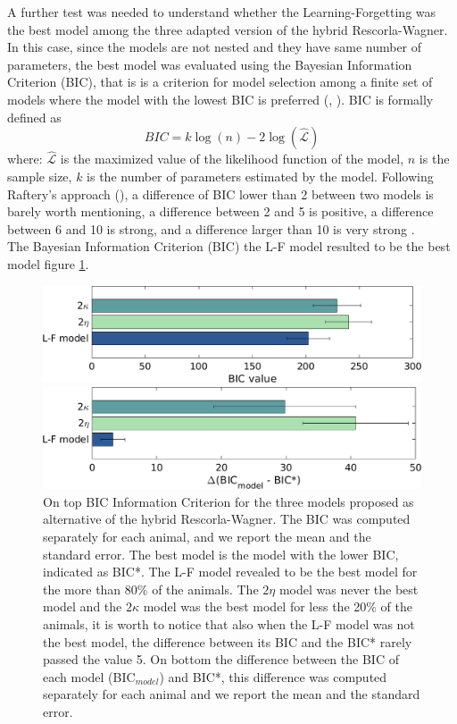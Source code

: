 A further test was needed to understand whether the Learning-Forgetting was the best model among the three adapted version of the hybrid Rescorla-Wagner. In this case, since the models are not nested and they have same number of parameters, the best model was evaluated using the Bayesian Information Criterion (BIC), that is is a criterion for model selection among a finite set of models where the model with the lowest BIC is preferred (\cite{Schwarz}, \cite{NeathCavanaugh}). BIC is formally defined as 
\begin{equation*}
    BIC=k\log(n)-2\log(\hat{\mathcal{L}})
\end{equation*}
where:
${\hat{\mathcal{L}}}$ is the maximized value of the likelihood function of the model, $n$ is the sample size, $k$ is the number of parameters estimated by the model.
Following Raftery’s approach (\cite{Raftery}), a difference of BIC lower than 2 between two models is barely worth mentioning, a difference between 2 and 5 is positive, a difference between 6 and 10 is strong, and a difference larger than 10 is very strong .\\
The Bayesian Information Criterion (BIC) the L-F model resulted to be the best model figure \ref{fig:BIC}.\\
\begin{figure}
    \centering
    \includegraphics[scale=0.5]{figures/BIC_Value.png}
    
    \vspace{1cm}
    
    \includegraphics[scale=0.5]{figures/DeltaBIC.png}
    \caption{On top BIC Information Criterion for the three models proposed as alternative of the hybrid Rescorla-Wagner. The BIC was computed separately for each animal, and we report the mean and the standard error. The best model is the model with the lower BIC, indicated as BIC*. The L-F model revealed to be the best model for the more than 80$\%$ of the animals. The $2\eta$ model was never the best model and the $2\kappa$ model was the best model for less the 20$\%$ of the animals, it is worth to notice that also when the L-F model was not the best model, the difference between its BIC and the BIC* rarely passed the value 5. On bottom the difference between the BIC of each model (BIC$_{model}$) and BIC*, this difference was computed separately for each animal and we report the mean and the standard error.}
    \label{fig:BIC}
\end{figure}

